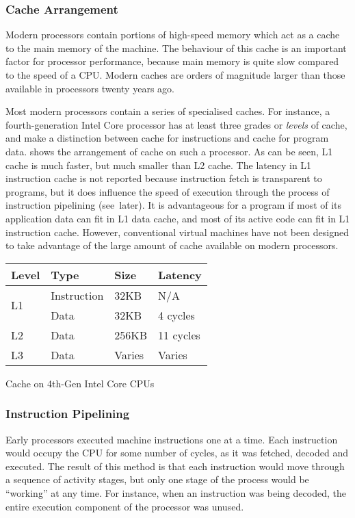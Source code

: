 			\subsubsection{Cache Arrangement}
			Modern processors contain portions of high-speed memory which act as a cache to the main memory of the machine. The behaviour of this cache is an important factor for processor performance, because main memory is quite slow compared to the speed of a CPU. Modern caches are orders of magnitude larger than those available in processors twenty years ago. 
			
			Most modern processors contain a series of specialised caches. For instance, a fourth-generation Intel Core processor has at least three grades or \emph{levels} of cache, and make a distinction between cache for instructions and cache for program data.  shows the arrangement of cache on such a processor. As can be seen, L1 cache is much faster, but much smaller than L2 cache. The latency in L1 instruction cache is not reported because instruction fetch is transparent to programs, but it does influence the speed of execution through the process of instruction pipelining (see~later). It is advantageous for a program if most of its application data can fit in L1 data cache, and most of its active code can fit in L1 instruction cache. However, conventional virtual machines have not been designed to take advantage of the large amount of cache available on modern processors.
			
			\begin{myfigure}
				\begin{tabular}{ | l | l | l | l | }
					\hline
					Level & Type & Size & Latency \\ 
					\hline
					\multirow{2}{*}{L1} & Instruction & 32KB & N/A \\
					& Data & 32KB & 4 cycles \\
					\hline
					L2 & Data & 256KB & 11 cycles \\
					\hline
					L3 & Data & Varies & Varies \\
					\hline
				\end{tabular}
				\caption{Cache on 4th-Gen Intel Core CPUs \citep{optimisationreference}}
				\label{fig:cachenumbers}
			\end{myfigure}
			
			\subsubsection{Instruction Pipelining}
			Early processors executed machine instructions one at a time. Each instruction would occupy the CPU for some number of cycles, as it was fetched, decoded and executed. The result of this method is that each instruction would move through a sequence of activity stages, but only one stage of the process would be ``working'' at any time. For instance, when an instruction was being decoded, the entire execution component of the processor was unused.
			
